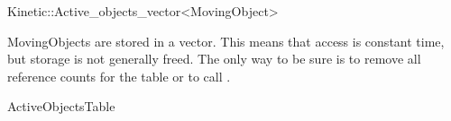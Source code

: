 

\begin{ccRefClass}{Kinetic::Active_objects_vector<MovingObject>}  %


\ccDefinition
  

MovingObjects are stored in a vector. This means that access is constant
time, but storage is not generally freed. The only way to be sure is
to remove all reference counts for the table or to call .



\ccIsModel

ActiveObjectsTable




\end{ccRefClass}


